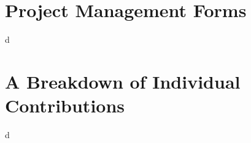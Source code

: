 \documentclass[12pt, a4paper]{report}
\begin{document}



\singlespace

\newpage
\appendix
\appendixpage
\addappheadtotoc

\chapter{Project Management Forms}
d
\chapter{A Breakdown of Individual Contributions}
d
\end{document}
